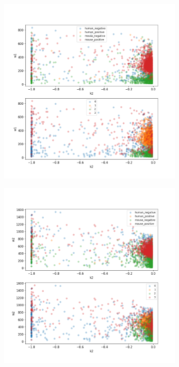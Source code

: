 \begin{figure}
\begin{subfigure}{0.3\textwidth}
	\end{subfigure}
	\hfill
	\begin{subfigure}{0.3\textwidth}
		\includegraphics[width=\textwidth]{fig/seperate_k2_w1}
	\end{subfigure}
	\hfill
	\begin{subfigure}{0.3\textwidth}
		\includegraphics[width=\textwidth]{fig/seperate_k2_w2}

\end{subfigure}
\end{figure}
